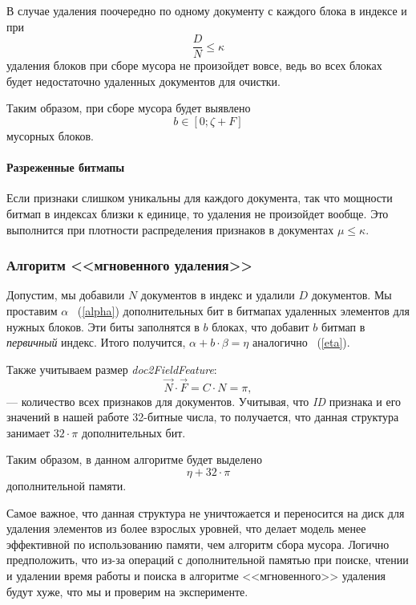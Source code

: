 В случае удаления поочередно по одному документу с каждого блока в индексе
и при
\begin{equation}
    \frac{D}{N} \leq \kappa
\end{equation}
удаления блоков при сборе мусора не произойдет вовсе, ведь во всех блоках будет недостаточно
удаленных документов для очистки.

Таким образом, при сборе мусора будет выявлено
\begin{equation}
    b \in \left[0;\zeta + F\right]
\end{equation}
мусорных блоков.

\paragraph{Разреженные битмапы}

Если признаки слишком уникальны для каждого документа, так что мощности битмап
в индексах близки к единице, то удаления не произойдет вообще. Это выполнится
при плотности распределения признаков в документах $\mu \leq \kappa$.

\subsubsection{Алгоритм <<мгновенного удаления>>}

Допустим, мы добавили $N$ документов в индекс и удалили $D$ документов. Мы
проставим $\alpha$ ~(\ref{alpha}) дополнительных бит в битмапах удаленных элементов для нужных блоков.
Эти биты заполнятся в $b$ блоках, что добавит $b$ битмап в \textit{первичный}
индекс. Итого получится, $\alpha + b \cdot \beta = \eta$ аналогично ~(\ref{eta}).

Также учитываем размер \textit{doc2FieldFeature}: 
\begin{equation}
    \vec{N} \cdot \vec{F} = C \cdot N= \pi,
\end{equation}
— количество всех признаков для документов. Учитывая, что \textit{ID} признака
и его значений в нашей работе 32-битные числа, то получается, что данная структура
занимает $32 \cdot \pi$ дополнительных бит.

Таким образом, в данном алгоритме будет выделено 
\begin{equation}
    \eta + 32\cdot \pi
\end{equation}
дополнительной памяти.

Самое важное, что данная структура не уничтожается и переносится на диск для
удаления элементов из более взрослых уровней, что делает модель менее эффективной по
использованию памяти, чем алгоритм сбора мусора. Логично предположить, что из-за
операций с дополнительной памятью при поиске, чтении и удалении время работы и
поиска в алгоритме <<мгновенного>> удаления будут хуже, что мы и проверим на эксперименте.